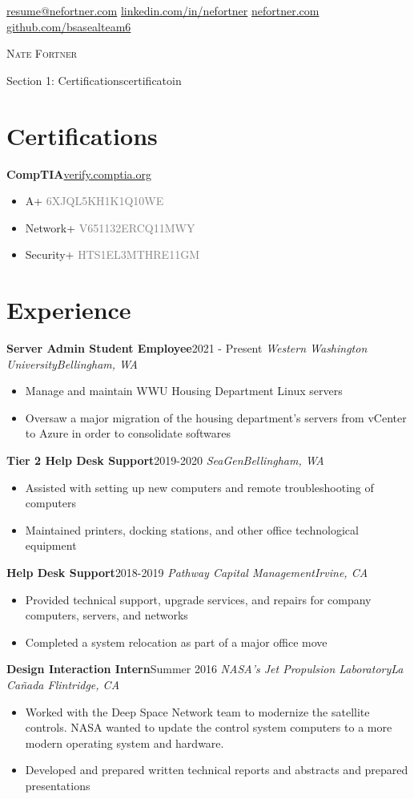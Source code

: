 \documentclass{article}
\newcommand{\alignicon}[2][nmbr]{\eqmakebox[#1]{\strut #2}}
\newcommand{\topLevelItem}[4]{
    \textbf{#1}\hfill #4\newline
    \emph{#2\hfill #3}\newline
    \vspace{-18pt}\begin{itemize}
}
\newcommand{\certificationType}[2]{
    \textbf{#1}\hfill #2\newline
    \vspace{-18pt}\begin{itemize}
}
\newcommand{\topLevelItemEnd}{\end{itemize}\vspace{5pt}}
\newcommand{\certificationTypeEnd}{\end{itemize}\vspace{5pt}}
\newcommand{\lowLevelItem}[1]{
    \item\small{#1}\vspace{-8pt}
}
\newcommand{\certification}[2]{
    \lowLevelItem{#1 \hfill \textcolor{gray}{#2}}
}
\begin{document}
    \begin{center}
        \noindent\alignicon\faEnvelope\quad\href{mailto:resume@nefortner.com}{resume@nefortner.com}\hfill %
        \href{https://linkedin.com/in/nefortner}{linkedin.com/in/nefortner}\quad\alignicon\faLinkedin\newline %
        \alignicon\faGlobe\quad\href{https://nefortner.com}{nefortner.com}\hfill %
        \href{https://github.com/bsasealteam6}{github.com/bsasealteam6}\quad\alignicon\faGithub\vspace*{-0.33in} %
        
        {\fontsize{28}{0}\selectfont\scshape Nate Fortner}\vspace{5pt}
    \end{center}
    Section 1: Certificationscertificatoin
    \section*{Certifications}
        \certificationType{CompTIA}{\href{https://verify.comptia.org}{verify.comptia.org}}
            \certification{A+}{6XJQL5KH1K1Q10WE}
            \certification{Network+}{V651132ERCQ11MWY}
            \certification{Security+}{HTS1EL3MTHRE11GM}
        \certificationTypeEnd
    \section*{Experience}
        \topLevelItem{Server Admin Student Employee}{Western Washington University}{Bellingham, WA}{2021 - Present}
            \lowLevelItem{Manage and maintain WWU Housing Department Linux servers}
            \lowLevelItem{Oversaw a major migration of the housing department’s servers from vCenter to Azure in order to consolidate softwares}
        \topLevelItemEnd
        \topLevelItem{Tier 2 Help Desk Support}{SeaGen}{Bellingham, WA}{2019-2020}
            \lowLevelItem{Assisted with setting up new computers and remote troubleshooting of computers}
            \lowLevelItem{Maintained printers, docking stations, and other office technological equipment}
        \topLevelItemEnd
        \topLevelItem{Help Desk Support}{Pathway Capital Management}{Irvine, CA}{2018-2019}
            \lowLevelItem{Provided technical support, upgrade services, and repairs for company computers, servers, and networks}
            \lowLevelItem{Completed a system relocation as part of a major office move}
        \topLevelItemEnd
        \topLevelItem{Design Interaction Intern}{NASA's Jet Propulsion Laboratory}{La Ca\~{n}ada Flintridge, CA}{Summer 2016}
            \lowLevelItem{Worked with the Deep Space Network team to modernize the satellite controls. NASA wanted to update the control system computers to a more modern operating system and hardware.}
            \lowLevelItem{Developed and prepared written technical reports and abstracts and prepared presentations}
        \topLevelItemEnd
\end{document}
